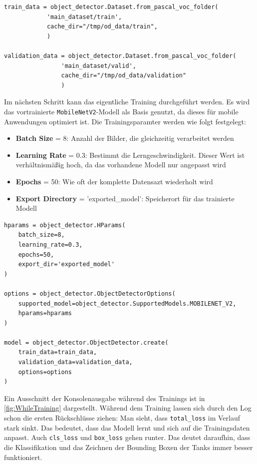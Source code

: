 \begin{lstlisting}
train_data = object_detector.Dataset.from_pascal_voc_folder(
            'main_dataset/train',
            cache_dir="/tmp/od_data/train",
            )

validation_data = object_detector.Dataset.from_pascal_voc_folder(
                'main_dataset/valid',
                cache_dir="/tmp/od_data/validation"
                )

\end{lstlisting}
Im nächsten Schritt kann das eigentliche Training durchgeführt werden. Es wird das vortrainierte \verb|MobileNetV2|-Modell als Basis genutzt, da dieses für mobile Anwendungen optimiert ist. Die Trainingsparamter werden wie folgt festgelegt:
\begin{itemize}
    \item \textbf{Batch Size} = 8: Anzahl der Bilder, die gleichzeitig verarbeitet werden
    \item \textbf{Learning Rate} = 0.3: Bestimmt die Lerngeschwindigkeit. Dieser Wert ist verhältnismäßig hoch, da das vorhandene Modell nur angepasst wird
    \item \textbf{Epochs} = 50: Wie oft der komplette Datensazt wiederholt wird
    \item \textbf{Export Directory} = 'exported\_model': Speicherort für das trainierte Modell 
\end{itemize}
\begin{lstlisting}
hparams = object_detector.HParams(
    batch_size=8,
    learning_rate=0.3,
    epochs=50,
    export_dir='exported_model'
)

options = object_detector.ObjectDetectorOptions(
    supported_model=object_detector.SupportedModels.MOBILENET_V2,
    hparams=hparams
)

model = object_detector.ObjectDetector.create(
    train_data=train_data,
    validation_data=validation_data,
    options=options
)

\end{lstlisting}
Ein Ausschnitt der Konsolenausgabe während des Trainings ist in \autoref{fig:WhileTraining} dargestellt. Während dem Training lassen sich durch den Log schon die ersten Rückschlüsse ziehen:
Man sieht, dass \texttt{total\_loss} im Verlauf stark sinkt. Das bedeutet, dass das Modell lernt und sich auf die Trainingsdaten anpasst. Auch \texttt{cls\_loss} und \texttt{box\_loss} gehen runter. Das deutet daraufhin, dass die Klassifikation und das Zeichnen der Bounding Boxen der Tanks immer besser funktioniert.
